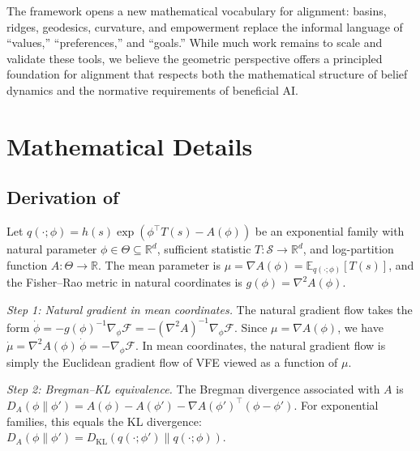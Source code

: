 \documentclass[11pt,a4paper]{article}
\theoremstyle{definition}
\newcommand{\R}{\mathbb{R}}
\newcommand{\E}{\mathbb{E}}
\newcommand{\VFE}{\mathcal{F}}
\newcommand{\cS}{\mathcal{S}}
\newcommand{\dkl}{D_{\mathrm{KL}}}
\begin{document}
The framework opens a new mathematical vocabulary for alignment: basins, ridges, geodesics, curvature, and empowerment replace the informal language of ``values,'' ``preferences,'' and ``goals.'' While much work remains to scale and validate these tools, we believe the geometric perspective offers a principled foundation for alignment that respects both the mathematical structure of belief dynamics and the normative requirements of beneficial AI.






\appendix

\section{Mathematical Details}
\label{app:math}

\subsection{Derivation of }
\label{app:derivation_var_wass}

Let $q(\cdot; \phi) = h(s) \exp(\phi^\top T(s) - A(\phi))$ be an exponential family with natural parameter $\phi \in \Theta \subseteq \R^d$, sufficient statistic $T: \cS \to \R^d$, and log-partition function $A: \Theta \to \R$. The mean parameter is $\mu = \nabla A(\phi) = \E_{q(\cdot;\phi)}[T(s)]$, and the Fisher--Rao metric in natural coordinates is $g(\phi) = \nabla^2 A(\phi)$.

\textit{Step 1: Natural gradient in mean coordinates.} The natural gradient flow takes the form $\dot{\phi} = -g(\phi)^{-1} \nabla_\phi \VFE = -(\nabla^2 A)^{-1} \nabla_\phi \VFE$. Since $\mu = \nabla A(\phi)$, we have $\dot{\mu} = \nabla^2 A(\phi) \, \dot{\phi} = -\nabla_\phi \VFE$. In mean coordinates, the natural gradient flow is simply the Euclidean gradient flow of VFE viewed as a function of $\mu$.

\textit{Step 2: Bregman--KL equivalence.} The Bregman divergence associated with $A$ is $D_A(\phi \| \phi') = A(\phi) - A(\phi') - \nabla A(\phi')^\top (\phi - \phi')$. For exponential families, this equals the KL divergence: $D_A(\phi \| \phi') = \dkl(q(\cdot; \phi') \| q(\cdot; \phi))$.
\end{document}
